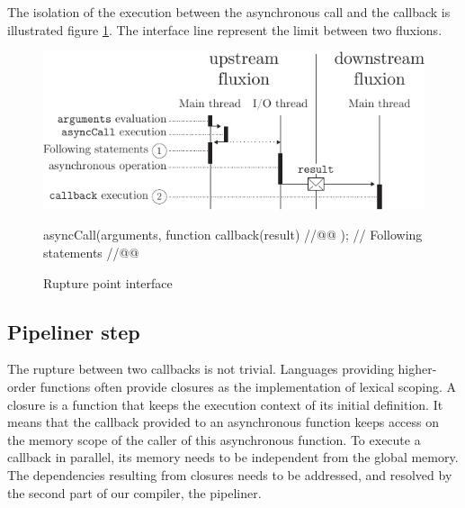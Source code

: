 The isolation of the execution between the asynchronous call and the callback is illustrated figure \ref{fig:basicrp}.
The interface line represent the limit between two fluxions.

\begin{figure}[h!]
\begin{center}
  \includegraphics[width=\linewidth]{ressources/basicrp.pdf}
  \begin{code}
asyncCall(arguments, function callback(result){ //@@ });
// Following statements //@@
  \end{code}
  \caption{Rupture point interface}
  \label{fig:basicrp}
\end{center}
\end{figure}









\subsection{Pipeliner step} \label{section:compiler:pipeliner}

The rupture between two callbacks is not trivial.
Languages providing higher-order functions often provide closures as the implementation of lexical scoping.
A closure is a function that keeps the execution context of its initial definition.
It means that the callback provided to an asynchronous function keeps access on the memory scope of the caller of this asynchronous function.
To execute a callback in parallel, its memory needs to be independent from the global memory.
The dependencies resulting from closures needs to be addressed, and resolved by the second part of our compiler, the pipeliner.

